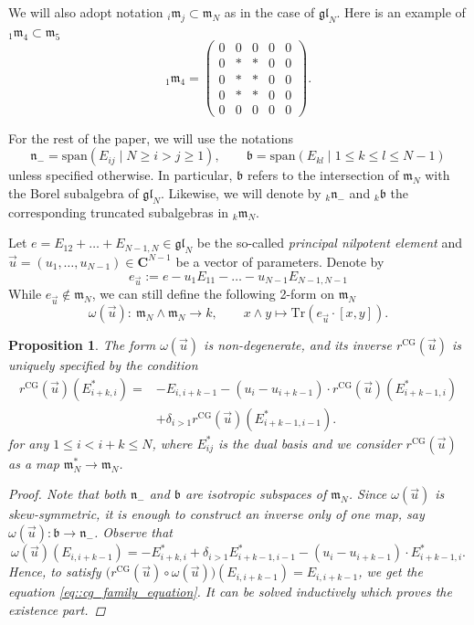 \documentclass[10pt,a4paper]{article}
\numberwithin{equation}{section}
\newtheorem{Proposition}[Theorem]{Proposition}
{ \theoremstyle{definition}
	\newtheorem{Definition}[Theorem]{Definition}
	\newtheorem{Note}[Theorem]{Note}
	\newtheorem{Example}[Theorem]{Example}
	\newtheorem{Remark}[Theorem]{Remark} }
\newcommand{\CG}{\mathrm{CG}}
\newcommand{\Tr}{\mathrm{Tr}}
\newcommand{\C}{\mathbf{C}}
\renewcommand{\b}{\mathfrak{b}}
\newcommand{\n}{\mathfrak{n}}
\newcommand{\m}{\mathfrak{m}}
\newcommand{\gl}{\mathfrak{gl}}
\begin{document}
	We will also adopt notation ${}_i \m_j \subset \m_N$ as in the case of $\gl_N$. Here is an example of ${}_1 \m_4 \subset \m_5$
	\[
	{}_1 \m_4 = \begin{pmatrix}
		0 & 0 & 0 & 0 & 0 \\
		0 & * & * & 0 & 0 \\
		0 & * & * & 0 & 0 \\
		0 & * & * & 0 & 0 \\
		0& 0 & 0 & 0 & 0
	\end{pmatrix}.
	\]
	
	For the rest of the paper, we will use the notations
	\[
			\n_- = \mathrm{span}(E_{ij} \mid N \geq i > j \geq 1), \qquad
			\b = \mathrm{span}(E_{kl} \mid 1 \leq k \leq l \leq N-1)
	\]
	unless specified otherwise. In particular, $\b$ refers to the intersection of $\m_N$ with the Borel subalgebra of $\gl_N$. Likewise, we will denote by ${}_k\n_-$ and ${}_k \b$ the corresponding truncated subalgebras in ${}_k \m_N$.
	
	Let $e = E_{12} + \dots + E_{N-1,N} \in \gl_N$ be the so-called \emph{principal nilpotent element} and $\vec{u}=(u_1,\dots,u_{N-1})\in \C^{N-1}$ be a vector of parameters. Denote by
	\begin{equation}
		\label{eq::principal_nilpotent}
		e_{\vec{u}} := e - u_1 E_{11} - \dots - u_{N-1} E_{N-1,N-1}
	\end{equation}
	While $e_{\vec{u}} \not\in \m_N$, we can still define the following 2-form on $\m_N$
	\[%
		\omega(\vec{u})\colon\ \m_N \wedge \m_N \rightarrow k, \qquad x\wedge y \mapsto \Tr(e_{\vec{u}}\cdot [x,y]).
	\]
	
	\begin{Proposition}
		\label{prop::cg_family_equation}
		The form $\omega(\vec{u})$ is non-degenerate, and its inverse $r^{\CG}(\vec{u})$ is uniquely specified by the condition
		\begin{align}
			r^{\CG}(\vec{u})(E_{i+k,i}^*) ={}& -E_{i,i+k-1} - (u_i - u_{i+k-1}) \cdot r^{\CG}(\vec{u})(E_{i+k-1,i}^*)\nonumber\\
&+ \delta_{i>1} r^{\CG}(\vec{u})(E_{i+k-1,i-1}^*).\label{eq::cg_family_equation}
		\end{align}
		for any $1 \leq i < i+k \leq N$, where $E_{ij}^*$ is the dual basis and we consider $r^{\CG}(\vec{u})$ as a map $ \m_N^* \rightarrow \m_N$.
		\begin{proof}
			Note that both $\n_-$ and $\b$ are isotropic subspaces of $\m_N$. Since $\omega(\vec{u})$ is skew-symmetric, it is enough to construct an inverse only of one map, say $\omega(\vec{u})\colon \b \rightarrow \n_-$. Observe that
			\[
			\omega(\vec{u})(E_{i,i+k-1}) = -E_{i+k,i}^* + \delta_{i>1} E_{i+k-1,i-1}^* - (u_i - u_{i+k-1}) \cdot E_{i+k-1,i}^*.
			\]
			Hence, to satisfy $\bigl(r^{\CG}(\vec{u}) \circ \omega(\vec{u}) \bigr) (E_{i,i+k-1}) = E_{i,i+k-1}$, we get the equation \eqref{eq::cg_family_equation}. It can be solved inductively which proves the existence part.
		\end{proof}
	\end{Proposition}
	
\end{document}
